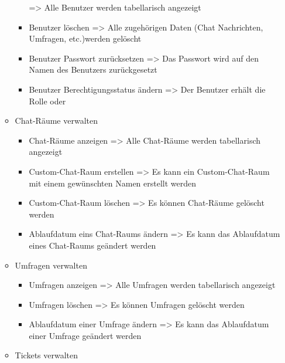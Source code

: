 \begin{itemize}
\begin{itemize}
\begin{itemize}
        \newline
        => Alle Benutzer werden tabellarisch angezeigt
        \item Benutzer löschen
        \newline
        => Alle zugehörigen Daten (Chat Nachrichten, Umfragen, etc.)werden gelöscht
        \item Benutzer Passwort zurücksetzen
        \newline
        => Das Passwort wird auf den Namen des Benutzers zurückgesetzt
        \item Benutzer Berechtigungsstatus ändern
        \newline
        => Der Benutzer erhält die Rolle  oder 
      \end{itemize}
    \item Chat-Räume verwalten
      \begin{itemize}
        \item Chat-Räume anzeigen
        \newline
        => Alle Chat-Räume werden tabellarisch angezeigt
        \item Custom-Chat-Raum erstellen
        \newline
        => Es kann ein Custom-Chat-Raum mit einem gewünschten Namen erstellt werden
        \item Custom-Chat-Raum löschen
        \newline
        => Es können Chat-Räume gelöscht werden
        \item Ablaufdatum eins Chat-Raums ändern
        \newline
        => Es kann das Ablaufdatum eines Chat-Raums geändert werden
      \end{itemize}
    \item Umfragen verwalten
      \begin{itemize}
        \item Umfragen anzeigen
        \newline
        => Alle Umfragen werden tabellarisch angezeigt
        \item Umfragen löschen
        \newline
        => Es können Umfragen gelöscht werden
        \item Ablaufdatum einer Umfrage ändern
        \newline
        => Es kann das Ablaufdatum einer Umfrage geändert werden
      \end{itemize}
    \item Tickets verwalten

\end{itemize}
\end{itemize}
